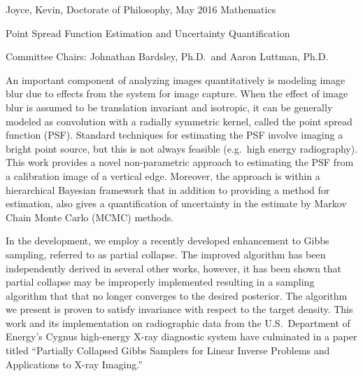 %
%
\setcounter{page}{2}                    %
%
%

Joyce, Kevin, Doctorate of Philosophy, May 2016 \hfill Mathematics
   
Point Spread Function Estimation and Uncertainty Quantification

%
Committee Chairs: Johnathan Bardsley, Ph.D.~and Aaron Luttman, Ph.D.    %
%
\setlength{\parindent}{2ex}
%
%


\indent 
An important component of analyzing images quantitatively is modeling image blur due to effects from the system for image capture. 
When the effect of image blur is assumed to be translation invariant and isotropic, it can be generally modeled as convolution with a radially symmetric kernel, called the point spread function (PSF).
Standard techniques for estimating the PSF involve imaging a bright point source, but this is not always feasible (e.g.~high energy radiography).  
This work provides a novel non-parametric approach to estimating the PSF from a calibration image of a vertical edge.
Moreover, the approach is within a hierarchical Bayesian framework that in addition to providing a method for estimation, also gives a quantification of uncertainty in the estimate by Markov Chain Monte Carlo (MCMC) methods.

\indent
In the development, we employ a recently developed enhancement to Gibbs sampling, referred to as partial collapse. 
The improved algorithm has been independently derived in several other works, however, it has been shown that partial collapse may be improperly implemented resulting in a sampling algorithm that that no longer converges to the desired posterior.
The algorithm we present is proven to satisfy invariance with respect to the target density.
This work and its implementation on radiographic data from the U.S.~Department of Energy's Cygnus high-energy X-ray diagnostic system have culminated in a paper titled ``Partially Collapsed Gibbs Samplers for Linear Inverse Problems and Applications to X-ray Imaging.'' 


